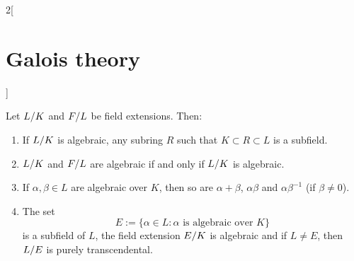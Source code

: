 \documentclass[../../../main.tex]{subfiles}
\begin{document}
\begin{multicols}{2}[\section{Galois theory}]
\begin{prop}
    Let $\quot{L}{K}$ and $\quot{F}{L}$ be field extensions. Then:
    \begin{enumerate}
      \item If $\quot{L}{K}$ is algebraic, any subring $R$ such that $K\subset R\subset L$ is a subfield.
      \item $\quot{L}{K}$ and $\quot{F}{L}$ are algebraic if and only if $\quot{L}{K}$ is algebraic.
      \item If $\alpha,\beta\in L$ are algebraic over $K$, then so are $\alpha+\beta$, $\alpha\beta$ and $\alpha\beta^{-1}$ (if $\beta\ne 0$).
      \item The set $$E:=\{\alpha\in L:\alpha\text{ is algebraic over }K\}$$ is a subfield of $L$, the field extension $\quot{E}{K}$ is algebraic and if $L\ne E$, then $\quot{L}{E}$ is purely transcendental.
    \end{enumerate}
  \end{prop}
\end{multicols}
\end{document}

